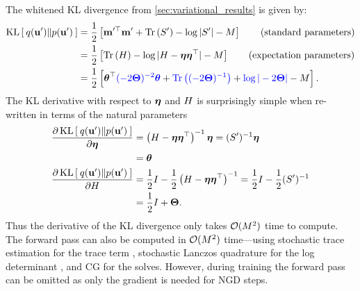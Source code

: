 The whitened KL divergence from \cref{sec:variational_results} is given by:
%
\begin{align}
  \kl{ q(\bu') }{ p(\bu') }
  &= \frac{1}{2} \left[ \bmm^{\prime \top} \bmm' + \tr{ \bS' } - \log \vert \bS' \vert - M \right]
  \tag{standard parameters} \\
  &= \frac{1}{2} \left[ \tr{ \bEta } - \log \vert \bEta - \boeta \boeta^\top \vert - M \right]
  \tag{expectation parameters} \\
  &= \frac{1}{2} \left[ \btheta^\top {\color{blue} (-2 \bTheta)^{-2} \btheta} + {\color{blue} \tr{(-2 \bTheta)^{-1}}} + {\color{blue} \log \vert -2 \bTheta \vert} - M \right]
  \label{eqn:kl_natural}.
\end{align}
%
The KL derivative with respect to $\boldsymbol{\eta}$ and $H$ is surprisingly simple when re-written in terms of the natural parameters
%
\begin{align}
  \frac{\partial \operatorname*{KL} \left[ \:  q(\mathbf{u}')  \Vert  p(\mathbf{u}')  \: \right]}{ \partial \boldsymbol{\eta} }
  &= \left( H - \boldsymbol{\eta} \boldsymbol{\eta}^\top \right)^{-1} \boldsymbol{\eta}
  = (S')^{-1} \boldsymbol{\eta}
  \nonumber \\
  &= \boldsymbol{\theta}
  \label{eqn:kl_mean_deriv}
  \\
  \frac{\partial \operatorname*{KL} \left[ \:  q(\mathbf{u}')  \Vert  p(\mathbf{u}')  \: \right]}{ \partial H }
  &= \frac 1 2 I - \frac 1 2 \left( H - \boldsymbol{\eta} \boldsymbol{\eta}^\top \right)^{-1}
  = \frac 1 2 I - \frac 1 2 (S')^{-1}
  \nonumber \\
  &= \frac 1 2 I + \boldsymbol{\Theta}.
  \label{eqn:kl_covar_deriv}
\end{align}
%
Thus the derivative of the KL divergence only takes $\bigo{M^2}$ time to compute.
The forward pass can also be computed in $\bigo{M^2}$ time---using stochastic trace estimation for the trace term \citep{cutajar2016preconditioning,gardner2018gpytorch}, stochastic Lanczos quadrature for the log determinant \citep{ubaru2017fast,dong2017scalable}, and CG for the solves.
However, during training the forward pass can be omitted as only the gradient is needed for NGD steps.

